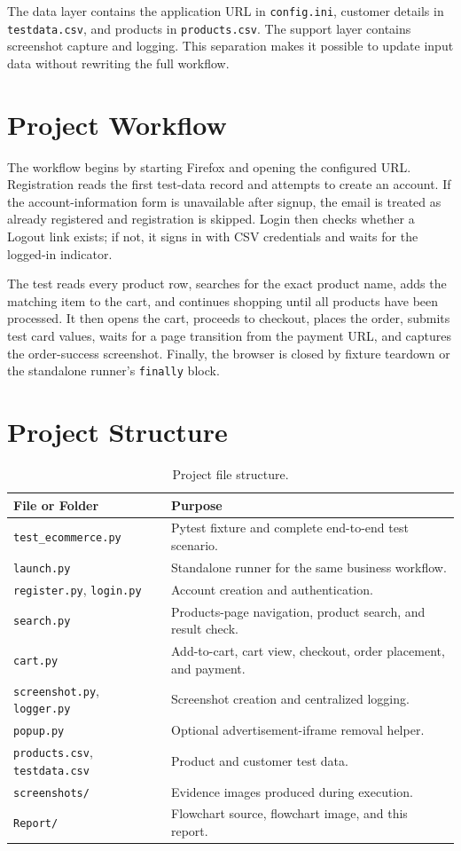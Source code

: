 \documentclass[12pt,a4paper]{article}
\begin{document}
The data layer contains the application URL in \texttt{config.ini}, customer details in \texttt{testdata.csv}, and products in \texttt{products.csv}. The support layer contains screenshot capture and logging. This separation makes it possible to update input data without rewriting the full workflow.

\section{Project Workflow}
The workflow begins by starting Firefox and opening the configured URL. Registration reads the first test-data record and attempts to create an account. If the account-information form is unavailable after signup, the email is treated as already registered and registration is skipped. Login then checks whether a Logout link exists; if not, it signs in with CSV credentials and waits for the logged-in indicator.

The test reads every product row, searches for the exact product name, adds the matching item to the cart, and continues shopping until all products have been processed. It then opens the cart, proceeds to checkout, places the order, submits test card values, waits for a page transition from the payment URL, and captures the order-success screenshot. Finally, the browser is closed by fixture teardown or the standalone runner's \texttt{finally} block.

\section{Project Structure}
\begin{table}[H]
\centering
\small
\begin{tabular}{p{}p{}}
\toprule
\textbf{File or Folder} & \textbf{Purpose} \\
\midrule
\texttt{test\_ecommerce.py} & Pytest fixture and complete end-to-end test scenario. \\
\texttt{launch.py} & Standalone runner for the same business workflow. \\
\texttt{register.py}, \texttt{login.py} & Account creation and authentication. \\
\texttt{search.py} & Products-page navigation, product search, and result check. \\
\texttt{cart.py} & Add-to-cart, cart view, checkout, order placement, and payment. \\
\texttt{screenshot.py}, \texttt{logger.py} & Screenshot creation and centralized logging. \\
\texttt{popup.py} & Optional advertisement-iframe removal helper. \\
\texttt{products.csv}, \texttt{testdata.csv} & Product and customer test data. \\
\texttt{screenshots/} & Evidence images produced during execution. \\
\texttt{Report/} & Flowchart source, flowchart image, and this report. \\
\bottomrule
\end{tabular}
\caption{Project file structure.}
\end{table}
\end{document}

